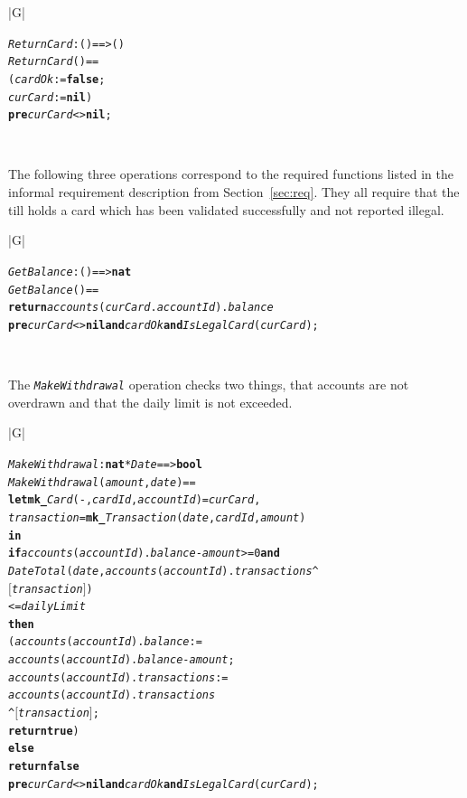 \documentclass[\pformat,12pt,twoside]{article}
\newenvironment{VDMgray}%
{\begin{tabular}{|G|}\hline\small\begin{alltt}}%
{\end{alltt}\normalsize\\
 \hline\end{tabular}}
\begin{document}
\begin{VDMgray}
 \textit{ReturnCard} : () ==\texttt{>} ()
 \textit{ReturnCard}() ==
   (\textit{cardOk} := \textbf{false};
    \textit{curCard}:= \textbf{nil})
 \textbf{pre} \textit{curCard} \texttt{<}\texttt{>} \textbf{nil};
\end{VDMgray}


The following three operations correspond to the required functions
listed in the informal requirement description from
Section~\ref{sec:req}. They all require that the till holds a card
which has been validated successfully and not reported illegal.

\begin{VDMgray}
 \textit{GetBalance} : () ==\texttt{>} \textbf{nat}
 \textit{GetBalance}() ==
   \textbf{return} \textit{accounts}(\textit{curCard}.\textit{accountId}).\textit{balance}
 \textbf{pre} \textit{curCard} \texttt{<}\texttt{>} \textbf{nil} \textbf{and} \textit{cardOk} \textbf{and} \textit{IsLegalCard}(\textit{curCard});
\end{VDMgray}


The \texttt{\emph{MakeWithdrawal}} operation checks two things, that accounts are 
not overdrawn and that the daily limit is not exceeded. 

\begin{VDMgray}
 \textit{MakeWithdrawal} : \textbf{nat} * \textit{Date} ==\texttt{>} \textbf{bool}
 \textit{MakeWithdrawal}(\textit{amount},\textit{date}) ==
   \textbf{let} \textbf{mk\_}\textit{Card}(-,\textit{cardId},\textit{accountId}) = \textit{curCard},
       \textit{transaction} = \textbf{mk\_}\textit{Transaction}(\textit{date},\textit{cardId},\textit{amount})
   \textbf{in}
     \textbf{if} \textit{accounts}(\textit{accountId}).\textit{balance} - \textit{amount} \texttt{>}= 0 \textbf{and}
        \textit{DateTotal}(\textit{date},\textit{accounts}(\textit{accountId}).\textit{transactions}{\textasciicircum}
	               \ensuremath{[}\textit{transaction}\ensuremath{]})
          \texttt{<}= \textit{dailyLimit}
     \textbf{then}
        (\textit{accounts}(\textit{accountId}).\textit{balance} :=
            \textit{accounts}(\textit{accountId}).\textit{balance} - \textit{amount};
         \textit{accounts}(\textit{accountId}).\textit{transactions} :=
            \textit{accounts}(\textit{accountId}).\textit{transactions} 
             {\textasciicircum} \ensuremath{[}\textit{transaction}\ensuremath{]};
         \textbf{return} \textbf{true})
     \textbf{else}
         \textbf{return} \textbf{false}
 \textbf{pre} \textit{curCard} \texttt{<}\texttt{>} \textbf{nil} \textbf{and} \textit{cardOk} \textbf{and} \textit{IsLegalCard}(\textit{curCard});
\end{VDMgray}
\end{document}
